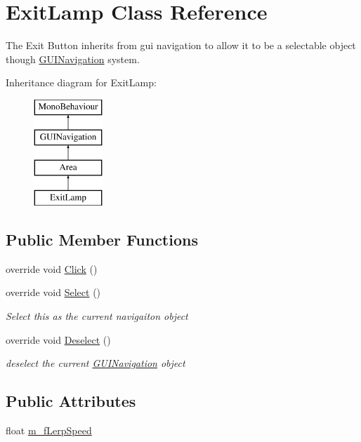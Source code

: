 \hypertarget{class_exit_lamp}{}\section{Exit\+Lamp Class Reference}
\label{class_exit_lamp}


The Exit Button inherits from gui navigation to allow it to be a selectable object though \mbox{\hyperlink{class_g_u_i_navigation}{G\+U\+I\+Navigation}} system.  


Inheritance diagram for Exit\+Lamp\+:\begin{figure}[H]
\begin{center}
\leavevmode
\includegraphics[height=4.000000cm]{class_exit_lamp}
\end{center}
\end{figure}
\subsection*{Public Member Functions}
\begin{DoxyCompactItemize}
\item 
override void \mbox{\hyperlink{class_exit_lamp_ae9f16c3c4507fc9eecb5fc4b0e225a6b}{Click}} ()
\item 
override void \mbox{\hyperlink{class_exit_lamp_af51dbc04e07910eaf73808834630fdd4}{Select}} ()
\begin{DoxyCompactList}\small\item\em Select this as the current navigaiton object \end{DoxyCompactList}\item 
override void \mbox{\hyperlink{class_exit_lamp_a7c1aeebd12704ebac65f5e2cd5564542}{Deselect}} ()
\begin{DoxyCompactList}\small\item\em deselect the current \mbox{\hyperlink{class_g_u_i_navigation}{G\+U\+I\+Navigation}} object \end{DoxyCompactList}\end{DoxyCompactItemize}
\subsection*{Public Attributes}
\begin{DoxyCompactItemize}
\item 
float \mbox{\hyperlink{class_exit_lamp_a806e871e931e56c429bcd5b32fcb73a0}{m\+\_\+f\+Lerp\+Speed}}
\end{DoxyCompactItemize}
